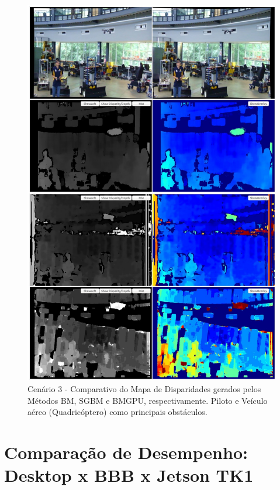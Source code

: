 \begin{figure}[H]
 	\centering
 	\includegraphics[scale=0.35]{./Resources/results/scene3_montage.jpg}
 	\caption{Cenário 3 - Comparativo do Mapa de Disparidades gerados pelos Métodos BM, SGBM e BMGPU, respectivamente. Piloto e Veículo aéreo (Quadricóptero) como principais obstáculos.}
 	\label{scene3_montage}
\end{figure}

\section{Comparação de Desempenho: Desktop x BBB x Jetson TK1}
\label{resultsComparison}

